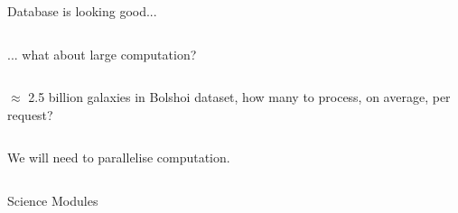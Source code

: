 \begin{frame}[plain]
  \Large
  \begin{columns}[c]
    \column{7cm}
    \begin{exampleblock}{}
      Database is looking good...
    \end{exampleblock}
    \column{4cm}
  \end{columns}
  \vspace{2cm}
  \begin{columns}[c]
    \column{3cm}
    \column{8cm}
    \begin{exampleblock}{}
      ... what about large computation?
    \end{exampleblock}
  \end{columns}
\end{frame}

\begin{frame}[plain]
  \Large
  \begin{columns}[c]
    \column{7cm}
    \begin{exampleblock}{}
      $\approx$ 2.5 billion galaxies in Bolshoi dataset,
      how many to process, on average, per request?
    \end{exampleblock}
    \column{4cm}
  \end{columns}
  \vspace{2cm}
  \begin{columns}[c]
    \column{3cm}
    \column{8cm}
    \begin{exampleblock}{}
      We will need to parallelise computation.
    \end{exampleblock}
  \end{columns}
\end{frame}

\begin{frame}[plain]
  \begin{block}{Science Modules}
    \vspace{1cm}
    \hspace{2cm}
    \vspace{1cm}
  \end{block}
\end{frame}

